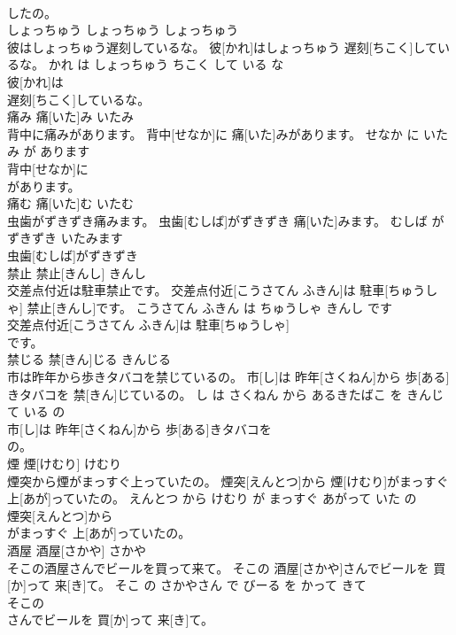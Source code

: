 \documentclass[8pt]{extreport}
\begin{document}
\begin{CJK}{UTF8}{min}
\\	したの。			
\\	しょっちゅう	しょっちゅう	しょっちゅう	
\\	彼はしょっちゅう遅刻しているな。	彼[かれ]はしょっちゅう 遅刻[ちこく]しているな。	かれ は しょっちゅう ちこく して いる な	
\\	彼[かれ]は
\\	遅刻[ちこく]しているな。			
\\	痛み	痛[いた]み	いたみ	
\\	背中に痛みがあります。	背中[せなか]に 痛[いた]みがあります。	せなか に いたみ が あります	
\\	背中[せなか]に
\\	があります。			
\\	痛む	痛[いた]む	いたむ	
\\	虫歯がずきずき痛みます。	虫歯[むしば]がずきずき 痛[いた]みます。	むしば が ずきずき いたみます	
\\	虫歯[むしば]がずきずき
\\	禁止	禁止[きんし]	きんし	
\\	交差点付近は駐車禁止です。	交差点付近[こうさてん ふきん]は 駐車[ちゅうしゃ] 禁止[きんし]です。	こうさてん ふきん は ちゅうしゃ きんし です	
\\	交差点付近[こうさてん ふきん]は 駐車[ちゅうしゃ]
\\	です。			
\\	禁じる	禁[きん]じる	きんじる	
\\	市は昨年から歩きタバコを禁じているの。	市[し]は 昨年[さくねん]から 歩[ある]きタバコを 禁[きん]じているの。	し は さくねん から あるきたばこ を きんじて いる の	
\\	市[し]は 昨年[さくねん]から 歩[ある]きタバコを
\\	の。			
\\	煙	煙[けむり]	けむり	
\\	煙突から煙がまっすぐ上っていたの。	煙突[えんとつ]から 煙[けむり]がまっすぐ 上[あが]っていたの。	えんとつ から けむり が まっすぐ あがって いた の	
\\	煙突[えんとつ]から
\\	がまっすぐ 上[あが]っていたの。			
\\	酒屋	酒屋[さかや]	さかや	
\\	そこの酒屋さんでビールを買って来て。	そこの 酒屋[さかや]さんでビールを 買[か]って 来[き]て。	そこ の さかやさん で びーる を かって きて	
\\	そこの
\\	さんでビールを 買[か]って 来[き]て。			

\end{CJK}
\end{document}
